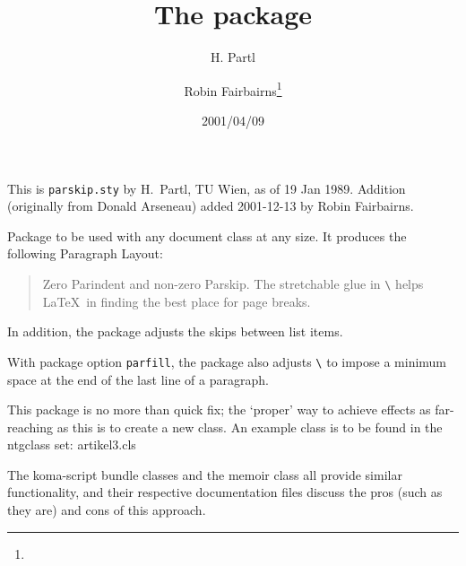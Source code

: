 \documentclass[pagesize=auto, fontsize=14pt, DIV=10, parskip=half]{scrartcl}
\title{The \pkg{parskip} package}
\author{H. Partl\and Robin Fairbairns\thanks{\mail{rf10@cam.ac.uk}}}
\date{2001/04/09}
\makeatletter
\newcommand*{\cls}[1]{\textsf{#1}}
\newcommand*{\cs}[1]{\texttt{\textbackslash#1}}
\newcommand*{\cmd}[1]{\cs{\expandafter\@gobble\string#1}}
\makeatother
\begin{document}
\maketitle

This is \texttt{parskip.sty} by H.~Partl, TU Wien, as of 19 Jan 1989.
Addition (originally from Donald Arseneau) added 2001-12-13 by Robin
Fairbairns.

Package to be used with any document class at any size.
It produces the following Paragraph Layout:

\begin{quote}
  Zero Parindent and non-zero Parskip. The stretchable glue in \cmd{\parskip}
  helps \LaTeX\ in finding the best place for page breaks.
\end{quote}

In addition, the package adjusts the skips between list items.

With package option \texttt{parfill}, the package also adjusts
\cmd\parfillskip{} to impose a minimum space at the end of
the last line of a paragraph.

This package is no more than quick fix; the `proper' way to achieve
effects as far-reaching as this is to create a new class.  An
example class is to be found in the \cls{ntgclass} set:
\cls{artikel3.cls}

The \cls{koma-script} bundle classes and the \cls{memoir} class all
provide similar functionality, and their respective documentation
files discuss the pros (such as they are) and cons of this approach.
\end{document}
